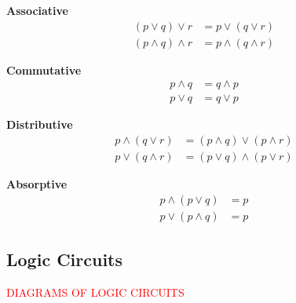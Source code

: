 \begin{law}\label{mod1:law:Associative}
   \textbf{Associative}
   \begin{align}
   (p \lor q) \lor r &= p \lor (q \lor r) \\
   (p \land q) \land r &= p \land (q \land r) 
   \end{align}
\end{law}

 \begin{law}\label{mod1:law:Commutative}
   \textbf{Commutative}
   \begin{align}
   p \land q &= q \land p \\
   p \lor q &= q \lor p
   \end{align}
\end{law}

\begin{law}\label{mod1:law:Distributive}
   \textbf{Distributive}
   \begin{align}
   p \land (q \lor r) &= (p \land q) \lor (p \land r) \\
   p \lor (q \land r) &= (p \lor q) \land (p \lor r) 
   \end{align}
\end{law}

\begin{law}\label{mod1:law:Absorptive}
   \textbf{Absorptive}
   \begin{align}
   p \land (p \lor q) &= p\\
   p \lor (p \land q) &= p
   \end{align}
\end{law}


\subsection{Logic Circuits}\label{mod1:section:LogicCircuits}

\textcolor{red}{DIAGRAMS OF LOGIC CIRCUITS}








      
      
      
      
      
      
      
      
      
      
      
      